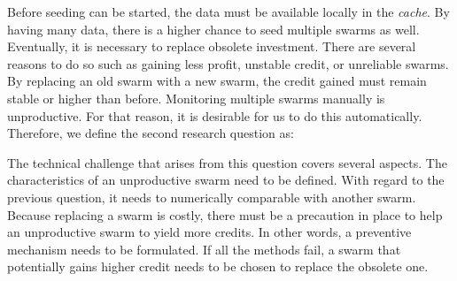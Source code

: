 
Before seeding can be started, the data must be available locally in the \textit{cache}. By having many data, there is a higher chance to seed multiple swarms as well. Eventually, it is necessary to replace obsolete investment. There are several reasons to do so such as gaining less profit, unstable credit, or unreliable swarms. By replacing an old swarm with a new swarm, the credit gained must remain stable or higher than before. Monitoring multiple swarms manually is unproductive. For that reason, it is desirable for us to do this automatically. Therefore, we define the second research question as: 

	
The technical challenge that arises from this question covers several aspects. The characteristics of an unproductive swarm need to be defined. With regard to the previous question, it needs to numerically comparable with another swarm. Because replacing a swarm is costly, there must be a precaution in place to help an unproductive swarm to yield more credits. In other words, a preventive mechanism needs to be formulated. If all the methods fail, a swarm that potentially gains higher credit needs to be chosen to replace the obsolete one. 